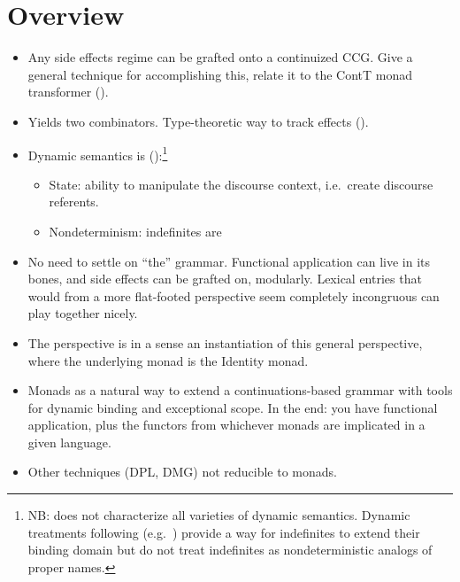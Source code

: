 \section{Overview}
\begin{itemize}	
	\item Any side effects regime can be grafted onto a continuized CCG. Give a general technique for accomplishing this, relate it to the ContT monad transformer (\citealt{Liangetal}).%
	
	\item Yields two combinators. Type-theoretic way to track effects (\citealt{Shan:2005}).%
	
	\item Dynamic semantics is (\citealt{Shan:2001}):\footnote{NB: does not characterize all varieties of dynamic semantics. Dynamic treatments following \citealt{GroenendijkStokhof:1990} (e.g.~\citealt{Zimmermann:1991, Szabolcsi:2003, Groote:2006}) provide a way for indefinites to extend their binding domain but do not treat indefinites as nondeterministic analogs of proper names.}%
	\begin{itemize}
		\item State: ability to manipulate the discourse context, i.e.~create discourse referents.%
		\item Nondeterminism: indefinites are 
	\end{itemize}
	
	\item No need to settle on ``the'' grammar. Functional application can live in its bones, and side effects can be grafted on, modularly. Lexical entries that would from a more flat-footed perspective seem completely incongruous can play together nicely. %
	
	\item The perspective \citealt{Barker:2002, ShanBarker:2006, BarkerShan:2014} is in a sense an instantiation of this general perspective, where the underlying monad is the \textsf{Identity} monad.%
	
	\item Monads as a natural way to extend a continuations-based grammar with tools for dynamic binding and exceptional scope. In the end: you have functional application, plus the functors from whichever monads are implicated in a given language. %
	
	\item Other techniques (DPL, DMG) not reducible to monads.
\end{itemize}

